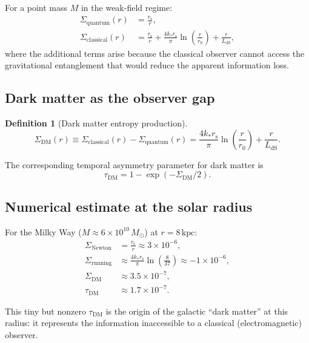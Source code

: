 \documentclass[aps,prd,preprint,superscriptaddress,longbibliography]{revtex4-2}
\newtheorem{definition}[theorem]{Definition}
\newcommand{\tauasym}{\tau}
\newcommand{\rs}{r_{\mathrm{s}}}
\newcommand{\LdS}{L_{\mathrm{dS}}}
\begin{document}
For a point mass $M$ in the weak-field regime:
\begin{align}
\Sigma_{\mathrm{quantum}}(r) &= \frac{\rs}{r},
\label{eq:Sigma_quantum}\\
\Sigma_{\mathrm{classical}}(r) &= \frac{\rs}{r}
+ \frac{4k_*\rs}{\pi}\ln\!\left(\frac{r}{r_0}\right)
+ \frac{r}{\LdS},
\label{eq:Sigma_classical}
\end{align}
where the additional terms arise because the classical observer
cannot access the gravitational entanglement that would reduce the
apparent information loss.

\subsection{Dark matter as the observer gap}

\begin{definition}[Dark matter entropy production]
\begin{equation}
\Sigma_{\mathrm{DM}}(r) \equiv
\Sigma_{\mathrm{classical}}(r) - \Sigma_{\mathrm{quantum}}(r)
= \frac{4k_*\rs}{\pi}\ln\!\left(\frac{r}{r_0}\right)
+ \frac{r}{\LdS}.
\label{eq:Sigma_DM}
\end{equation}
\end{definition}

The corresponding temporal asymmetry parameter for dark matter is
\begin{equation}
\tauasym_{\mathrm{DM}} = 1 - \exp(-\Sigma_{\mathrm{DM}}/2).
\label{eq:tau_DM}
\end{equation}

\subsection{Numerical estimate at the solar radius}

For the Milky Way ($M \approx 6\times 10^{10}\,M_\odot$) at
$r = 8\,\mathrm{kpc}$:
\begin{align}
\Sigma_{\mathrm{Newton}} &= \frac{\rs}{r}
\approx 3\times 10^{-6}, \nonumber\\
\Sigma_{\mathrm{running}} &\approx \frac{4k_*\rs}{\pi}
\ln\!\left(\frac{8}{37}\right) \approx -1\times 10^{-6}, \nonumber\\
\Sigma_{\mathrm{DM}} &\approx 3.5\times 10^{-7}, \nonumber\\
\tauasym_{\mathrm{DM}} &\approx 1.7\times 10^{-7}.
\label{eq:tau_solar}
\end{align}

This tiny but nonzero $\tauasym_{\mathrm{DM}}$ is the origin of the
galactic ``dark matter'' at this radius: it represents the information
inaccessible to a classical (electromagnetic) observer.
\end{document}
